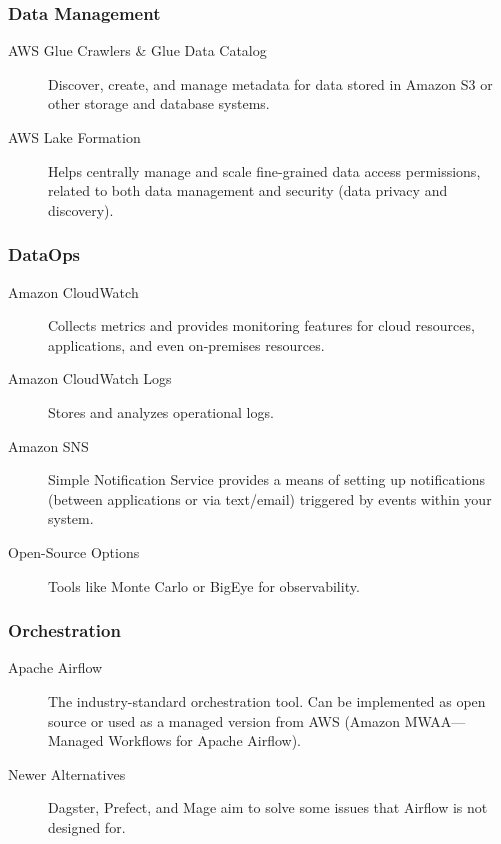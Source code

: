 \documentclass{article}
\begin{document}
\subsubsection{Data Management}
\begin{description}
    \item[AWS Glue Crawlers \& Glue Data Catalog] Discover, create, and manage metadata for data stored in Amazon S3 or other storage and database systems.

    \item[AWS Lake Formation] Helps centrally manage and scale fine-grained data access permissions, related to both data management and security (data privacy and discovery).
\end{description}

\subsubsection{DataOps}
\begin{description}
    \item[Amazon CloudWatch] Collects metrics and provides monitoring features for cloud resources, applications, and even on-premises resources.

    \item[Amazon CloudWatch Logs] Stores and analyzes operational logs.

    \item[Amazon SNS] Simple Notification Service provides a means of setting up notifications (between applications or via text/email) triggered by events within your system.

    \item[Open-Source Options] Tools like Monte Carlo or BigEye for observability.
\end{description}

\subsubsection{Orchestration}
\begin{description}
    \item[Apache Airflow] The industry-standard orchestration tool. Can be implemented as open source or used as a managed version from AWS (Amazon MWAA---Managed Workflows for Apache Airflow).

    \item[Newer Alternatives] Dagster, Prefect, and Mage aim to solve some issues that Airflow is not designed for.
\end{description}
\end{document}
